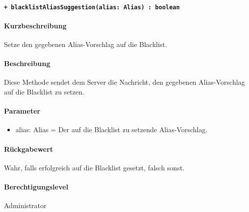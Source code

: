 \paragraph{\texttt{+ blacklistAliasSuggestion(alias: Alias) : boolean}}\label{AP_Backend_blacklistAliasSuggestion}%
\paragraph*{Kurzbeschreibung}
Setze den gegebenen Alias-Vorschlag auf die Blacklist.
\paragraph*{Beschreibung}
Diese Methode sendet dem Server die Nachricht, den gegebenen Alias-Vorschlag auf die Blacklist zu setzen.
\paragraph*{Parameter}
\begin{itemize}
    \item alias: Alias = Der auf die Blacklist zu setzende Alias-Vorschlag.
\end{itemize}
\paragraph*{Rückgabewert}
Wahr, falls erfolgreich auf die Blacklist gesetzt, falsch sonst.
\paragraph*{Berechtigungslevel}
Administrator